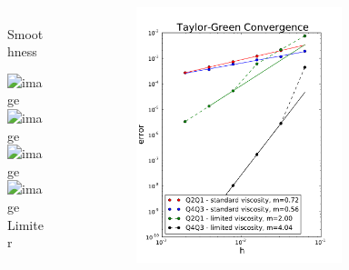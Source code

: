 \documentclass[8pt,xcolor=svgnames]{beamer}
\begin{document}
\begin{frame}
\begin{columns}
\begin{column}{0.25\textwidth}
\begin{figure}[t]
\begin{center}
\small{\\Smoothness}
\end{center}
\end{figure}
\begin{figure}[t]
\begin{center}
\includegraphics<1>[height=0.8\textwidth]{figs/TG-2/Q4-limiter-4.png}
\includegraphics<2>[height=0.8\textwidth]{figs/TG-2/Q4-limiter-5.png}
\includegraphics<3>[height=0.8\textwidth]{figs/TG-2/Q4-limiter-6.png}
\includegraphics<4>[height=0.8\textwidth]{figs/TG-2/Q4-limiter-7.png}
\small{\\Limiter}
\end{center}
\end{figure}
\end{column}
\begin{column}{0.5\textwidth}
\begin{figure}[t]
\begin{center}
\includegraphics[width=0.8\textwidth]{figs/TGConvergence.pdf}
\end{center}
\end{figure}
\end{column}
\end{columns}
\end{frame}
\end{document}
